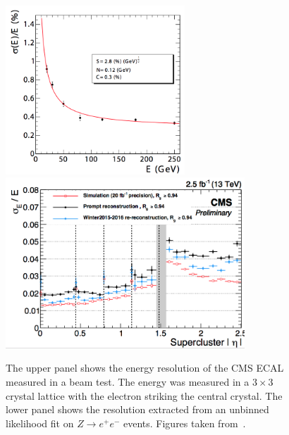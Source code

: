 \begin{figure}[hpb!]
	\centering
	\includegraphics[width=0.6\textwidth]{Figures/CMSECALRES} \\
	\vspace{2cm}
	\includegraphics[width=0.8\textwidth]{Figures/CMSECALRES2}
	\caption[The upper panel shows the energy resolution of the CMS ECAL measured in a beam test. The energy was measured in a $3\times3$ crystal lattice with the electron striking the central crystal. The lower panel shows the resolution extracted from an unbinned likelihood fit on $Z\rightarrow e^+e^-$ events.]{The upper panel shows the energy resolution of the CMS ECAL measured in a beam test. The energy was measured in a $3\times3$ crystal lattice with the electron striking the central crystal. The lower panel shows the resolution extracted from an unbinned likelihood fit on $Z\rightarrow e^+e^-$ events. Figures taken from~\cite{CMSExperiment, CMSECALRESMEAS}.}
	\label{fig:CMSECALRes}
\end{figure}



